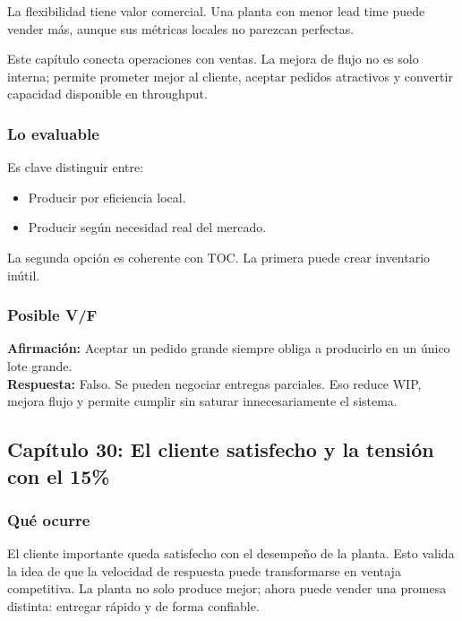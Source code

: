\documentclass[
  11pt,
]{article}
\providecommand{\tightlist}{%
  \setlength{\itemsep}{0pt}\setlength{\parskip}{0pt}}
\begin{document}
La flexibilidad tiene valor comercial. Una planta con menor lead time
puede vender más, aunque sus métricas locales no parezcan perfectas.

Este capítulo conecta operaciones con ventas. La mejora de flujo no es
solo interna; permite prometer mejor al cliente, aceptar pedidos
atractivos y convertir capacidad disponible en throughput.

\hypertarget{lo-evaluable-2}{%
\subsubsection{Lo evaluable}\label{lo-evaluable-2}}

Es clave distinguir entre:

\begin{itemize}
\tightlist
\item
  Producir por eficiencia local.
\item
  Producir según necesidad real del mercado.
\end{itemize}

La segunda opción es coherente con TOC. La primera puede crear
inventario inútil.

\hypertarget{posible-vf-2}{%
\subsubsection{Posible V/F}\label{posible-vf-2}}

\textbf{Afirmación:} Aceptar un pedido grande siempre obliga a
producirlo en un único lote grande.\\
\textbf{Respuesta:} Falso. Se pueden negociar entregas parciales. Eso
reduce WIP, mejora flujo y permite cumplir sin saturar innecesariamente
el sistema.

\hypertarget{capuxedtulo-30-el-cliente-satisfecho-y-la-tensiuxf3n-con-el-15}{%
\subsection{Capítulo 30: El cliente satisfecho y la tensión con el
15\%}\label{capuxedtulo-30-el-cliente-satisfecho-y-la-tensiuxf3n-con-el-15}}

\hypertarget{quuxe9-ocurre-3}{%
\subsubsection{Qué ocurre}\label{quuxe9-ocurre-3}}

El cliente importante queda satisfecho con el desempeño de la planta.
Esto valida la idea de que la velocidad de respuesta puede transformarse
en ventaja competitiva. La planta no solo produce mejor; ahora puede
vender una promesa distinta: entregar rápido y de forma confiable.
\end{document}
